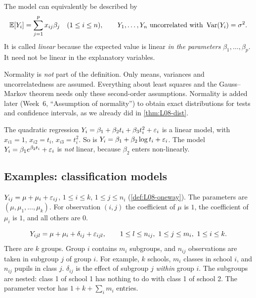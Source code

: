 \begin{remark}\label{rem:L09-alt}
The model can equivalently be described by
\[
\mathbb E[Y_i]=\sum_{j=1}^p x_{ij}\beta_j\quad(1\le i\le n),\qquad
Y_1,\dots,Y_n \text{ uncorrelated with } \operatorname{Var}(Y_i)=\sigma^2 .
\]
It is called \emph{linear} because the expected value is linear \emph{in the parameters}
$\beta_1,\dots,\beta_p$. It need not be linear in the explanatory variables.
\end{remark}

\begin{note}
Normality is \emph{not} part of the definition. Only means, variances and uncorrelatedness are
assumed. Everything about least squares and the Gauss--Markov theorem needs only these second-order
assumptions. Normality is added later (Week~6, ``Assumption of normality'') to obtain exact
distributions for tests and confidence intervals, as we already did in \cref{thm:L08-dist}.
\end{note}

\begin{example}\label{ex:L09-poly}
The quadratic regression $Y_i=\beta_1+\beta_2t_i+\beta_3t_i^2+\varepsilon_i$ is a linear model, with
$x_{i1}=1$, $x_{i2}=t_i$, $x_{i3}=t_i^2$. So is $Y_i=\beta_1+\beta_2\log t_i+\varepsilon_i$. The model
$Y_i=\beta_1e^{\beta_2t_i}+\varepsilon_i$ is \emph{not} linear, because $\beta_2$ enters non-linearly.
\end{example}

\subsection{Examples: classification models}
\begin{example}\label{ex:L09-oneway}
$Y_{ij}=\mu+\mu_i+\varepsilon_{ij}$, $1\le i\le k$, $1\le j\le n_i$ (\cref{def:L08-oneway}). The
parameters are $(\mu,\mu_1,\dots,\mu_k)$. For observation $(i,j)$ the coefficient of $\mu$ is $1$,
the coefficient of $\mu_i$ is $1$, and all others are $0$.
\end{example}

\begin{example}\label{ex:L09-nested}
\[
Y_{ijl}=\mu+\mu_i+\delta_{ij}+\varepsilon_{ijl},\qquad 1\le l\le n_{ij},\ 1\le j\le m_i,\ 1\le i\le k .
\]
There are $k$ groups. Group $i$ contains $m_i$ subgroups, and $n_{ij}$ observations are taken in
subgroup $j$ of group $i$. For example, $k$ schools, $m_i$ classes in school $i$, and $n_{ij}$
pupils in class $j$. $\delta_{ij}$ is the effect of subgroup $j$ \emph{within} group $i$. The
subgroups are nested: class 1 of school 1 has nothing to do with class 1 of school 2. The
parameter vector has $1+k+\sum_i m_i$ entries.
\end{example}

